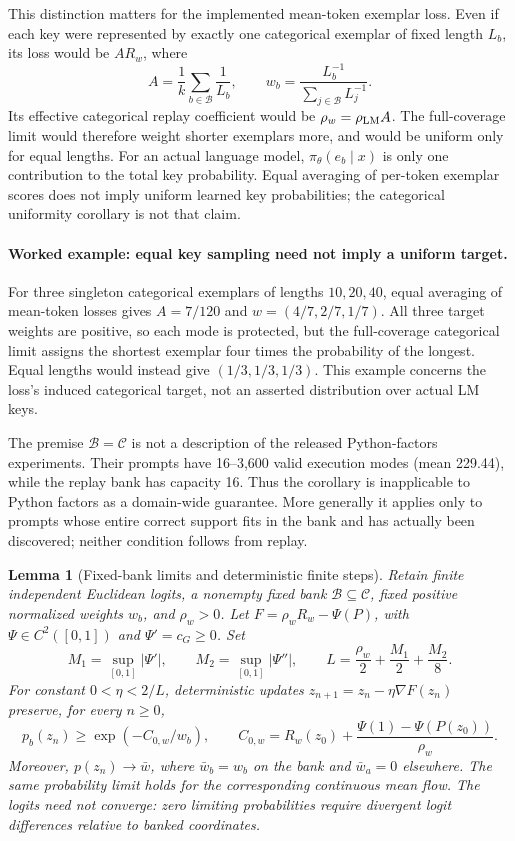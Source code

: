 \documentclass{article}
\newcommand{\1}{\mathbf 1}
\newtheorem{lemma}{Lemma}[section]
\theoremstyle{remark}
\theoremstyle{definition}
\theoremstyle{plain}
\begin{document}
This distinction matters for the implemented mean-token exemplar loss.
Even if each key were represented by exactly one categorical exemplar of
fixed length $L_b$, its loss would be $A R_w$, where
\[
 A=\frac1k\sum_{b\in\mathcal B}\frac1{L_b},\qquad
 w_b=\frac{L_b^{-1}}{\sum_{j\in\mathcal B}L_j^{-1}}.
\]
Its effective categorical replay coefficient would be $\rho_w=\rho_{\rm LM}A$.
The full-coverage limit would therefore weight shorter exemplars more, and
would be uniform only for equal lengths. For an actual language model,
$\pi_\theta(e_b\mid x)$ is only one contribution to the total key probability.
Equal averaging of per-token exemplar scores does not imply uniform learned
key probabilities; the categorical uniformity corollary is not that claim.

\paragraph{Worked example: equal key sampling need not imply a uniform target.}
For three singleton categorical exemplars of lengths $10,20,40$, equal
averaging of mean-token losses gives $A=7/120$ and
$w=(4/7,2/7,1/7)$. All three target weights are positive, so each mode is
protected, but the full-coverage categorical limit assigns the shortest
exemplar four times the probability of the longest. Equal lengths would
instead give $(1/3,1/3,1/3)$. This example concerns the loss's induced
categorical target, not an asserted distribution over actual LM keys.

The premise $\mathcal B=\mathcal C$ is not a description of the released
Python-factors experiments. Their prompts have 16--3,600 valid execution modes
(mean 229.44), while the replay bank has capacity 16. Thus the corollary is
inapplicable to Python factors as a domain-wide guarantee. More generally it
applies only to prompts whose entire correct support fits in the bank and has
actually been discovered; neither condition follows from replay.

\begin{lemma}[Fixed-bank limits and deterministic finite steps]
\label{lem:replay-finite-steps}
Retain finite independent Euclidean logits, a nonempty fixed bank
$\mathcal B\subseteq\mathcal C$, fixed positive normalized weights $w_b$,
and $\rho_w>0$. Let $F=\rho_wR_w-\Psi(P)$, with
$\Psi\in C^2([0,1])$ and $\Psi'=c_G\ge0$. Set
\[
 M_1=\sup_{[0,1]}|\Psi'|,\qquad
 M_2=\sup_{[0,1]}|\Psi''|,\qquad
 L=\frac{\rho_w}{2}+\frac{M_1}{2}+\frac{M_2}{8}.
\]
For constant $0<\eta<2/L$, deterministic updates
$z_{n+1}=z_n-\eta\nabla F(z_n)$ preserve, for every $n\ge0$,
\[
 p_b(z_n)\ge \exp(-C_{0,w}/w_b),\qquad
 C_{0,w}=R_w(z_0)+\frac{\Psi(1)-\Psi(P(z_0))}{\rho_w}.
\]
Moreover, $p(z_n)\to\bar w$, where $\bar w_b=w_b$ on the bank and
$\bar w_a=0$ elsewhere. The same probability limit holds for the corresponding
continuous mean flow. The logits need not converge: zero limiting probabilities require divergent logit differences relative to banked coordinates.
\end{lemma}
\end{document}
